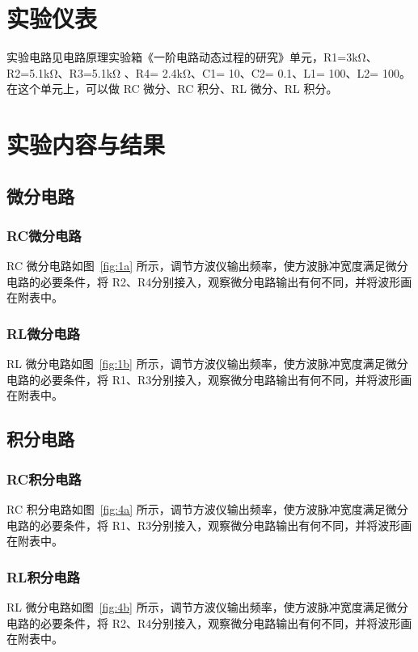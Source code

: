 \documentclass[a4paper,utf8]{article}
\begin{document}
\section{实验仪表}
    实验电路见电路原理实验箱《一阶电路动态过程的研究》单元，R1=3\unit{\kilo\ohm}、R2=5.1\unit{\kilo\ohm}、\linebreak R3=5.1\unit{\kilo\ohm} 、R4= 2.4\unit{\kilo\ohm}、C1= 10\unit{\uF}、C2= 0.1\unit{\uF}、L1= 100\unit{\mH}、L2= 100\unit{\mH}。在这个单元上，可以做 RC 微分、RC 积分、RL 微分、RL 积分。
    
\section{实验内容与结果}
    \subsection{微分电路}
        \subsubsection{RC微分电路}
            RC 微分电路如图~\ref{fig:1a} 所示，调节方波仪输出频率，使方波脉冲宽度满足微分电路的必要条件，将 R2、R4分别接入，观察微分电路输出有何不同，并将波形画在附表中。
        \subsubsection{RL微分电路}
            RL 微分电路如图~\ref{fig:1b} 所示，调节方波仪输出频率，使方波脉冲宽度满足微分电路的必要条件，将 R1、R3分别接入，观察微分电路输出有何不同，并将波形画在附表中。
    \subsection{积分电路}
        \subsubsection{RC积分电路}
            RC 积分电路如图~\ref{fig:4a} 所示，调节方波仪输出频率，使方波脉冲宽度满足微分电路的必要条件，将 R1、R3分别接入，观察微分电路输出有何不同，并将波形画在附表中。
        \subsubsection{RL积分电路}
            RL 微分电路如图~\ref{fig:4b} 所示，调节方波仪输出频率，使方波脉冲宽度满足微分电路的必要条件，将 R2、R4分别接入，观察微分电路输出有何不同，并将波形画在附表中。
    \newpage
\end{document}
